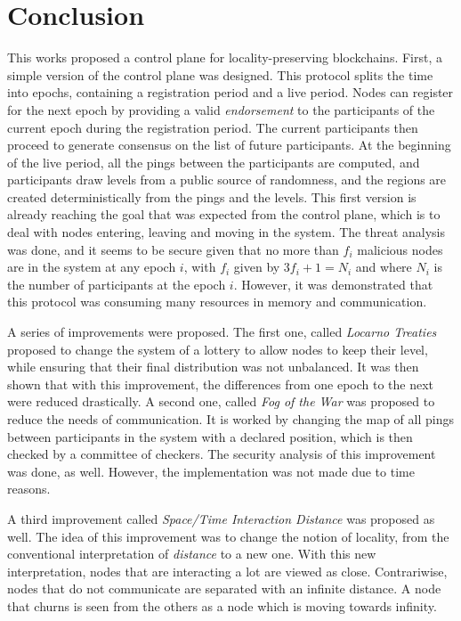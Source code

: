 \documentclass[a4paper,11pt,twoside=semi,openright]{report}
\begin{document}
\chapter{Conclusion} \label{chap:Conclusion} %

This works proposed a control plane for locality-preserving blockchains. First,
a simple version of the control plane was designed. This protocol splits the
time into epochs, containing a registration period and a live period. Nodes can
register for the next epoch by providing a valid \textit{endorsement} to the
participants of the current epoch during the registration period. The current
participants then proceed to generate consensus on the list of future
participants. At the beginning of the live period, all the pings between the
participants are computed, and participants draw levels from a public source of
randomness, and the regions are created deterministically from the pings and
the levels. This first version is already reaching the goal that was expected
from the control plane, which is to deal with nodes entering, leaving and
moving in the system. The threat analysis was done, and it seems to be secure
given that no more than $f_i$ malicious nodes are in the system at any epoch
$i$, with $f_i$ given by $3f_i+1=N_i$ and where $N_i$ is the number of
participants at the epoch $i$. However, it was demonstrated that this protocol
was consuming many resources in memory and communication. 

A series of improvements were proposed. The first one, called \textit{Locarno
Treaties} proposed to change the system of a lottery to allow nodes to keep
their level, while ensuring that their final distribution was not unbalanced.
It was then shown that with this improvement, the differences from one epoch to
the next were reduced drastically. A second one, called \textit{Fog of the War}
was proposed to reduce the needs of communication. It is worked by changing the
map of all pings between participants in the system with a declared position,
which is then checked by a committee of checkers. The security analysis of this
improvement was done, as well. However, the implementation was not made due to
time reasons. 

A third improvement called \textit{Space/Time Interaction Distance} was
proposed as well. The idea of this improvement was to change the notion of
locality, from the conventional interpretation of \textit{distance} to a new one.
With this new interpretation, nodes that are interacting a lot are viewed as
close. Contrariwise, nodes that do not communicate are separated with an
infinite distance. A node that churns is seen from
the others as a node which is moving towards infinity.  
\end{document}
